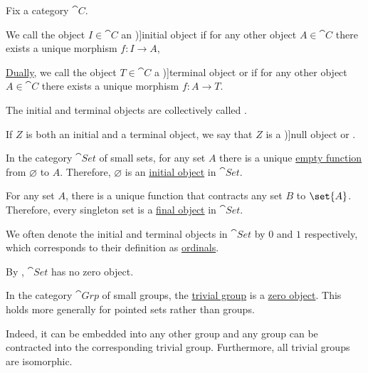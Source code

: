\begin{definition}\label{def:universal_objects}
  Fix a category \( \cat{C} \).

  \begin{thmenum}
     We call the object \( I \in \cat{C} \) an \term[ru=начальный объект (\cite[80]{ЦаленкоШульгейфер1974})]{initial object} if for any other object \( A \in \cat{C} \) there exists a unique morphism \( f: I \to A \),

     \hyperref[thm:categorical_principle_of_duality]{Dually}, we call the object \( T \in \cat{C} \) a \term[ru=конечный объект (\cite[80]{ЦаленкоШульгейфер1974})]{terminal object} or  if for any other object \( A \in \cat{C} \) there exists a unique morphism \( f: A \to T \).

    The initial and terminal objects are collectively called .

     If \( Z \) is both an initial and a terminal object, we say that \( Z \) is a \term[ru=нулевой объект (\cite[80]{ЦаленкоШульгейфер1974})]{null object} or .
  \end{thmenum}
\end{definition}

\begin{example}\label{ex:def:universal_objects}
  \begin{thmenum}
     In the category \hyperref[def:category_of_small_sets]{\( \cat{Set} \)} of small sets, for any set \( A \) there is a unique \hyperref[def:set_valued_map/empty]{empty function} from \( \varnothing \) to \( A \). Therefore, \( \varnothing \) is an \hyperref[def:universal_objects/initial]{initial object} in \( \cat{Set} \).

    For any set \( A \), there is a unique function that contracts any set \( B \) to \( \set{ A } \). Therefore, every singleton set is a \hyperref[def:universal_objects/terminal]{final object} in \( \cat{Set} \).

    We often denote the initial and terminal objects in \( \cat{Set} \) by \( 0 \) and \( 1 \) respectively, which corresponds to their definition as \hyperref[def:ordinal]{ordinals}.

    By , \( \cat{Set} \) has no zero object.

     In the category \hyperref[def:group/category]{\( \cat{Grp} \)} of small groups, the \hyperref[def:group/trivial]{trivial group} is a \hyperref[def:universal_objects/zero]{zero object}. This holds more generally for pointed sets rather than groups.

    Indeed, it can be embedded into any other group and any group can be contracted into the corresponding trivial group. Furthermore, all trivial groups are isomorphic.
  \end{thmenum}
\end{example}

